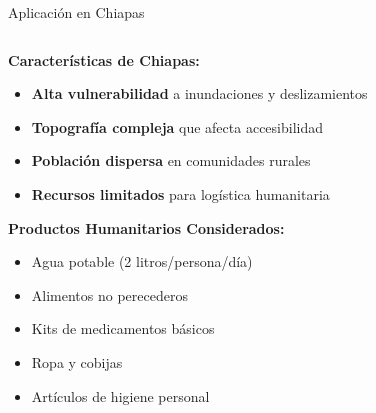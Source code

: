 \documentclass[
  ignorenonframetext,
]{beamer}
\providecommand{\tightlist}{%
  \setlength{\itemsep}{0pt}\setlength{\parskip}{0pt}}
\begin{document}
\begin{frame}{Aplicación en Chiapas}
\label{aplicaciuxf3n-en-chiapas}
\begin{columns}[T]
\begin{column}{0.6\linewidth}
\justifying

\textbf{Características de Chiapas:}

\begin{itemize}
\tightlist
\item
  \textbf{Alta vulnerabilidad} a inundaciones y deslizamientos
\item
  \textbf{Topografía compleja} que afecta accesibilidad
\item
  \textbf{Población dispersa} en comunidades rurales
\item
  \textbf{Recursos limitados} para logística humanitaria
\end{itemize}

\textbf{Productos Humanitarios Considerados:}

\begin{itemize}
\tightlist
\item
  Agua potable (2 litros/persona/día)
\item
  Alimentos no perecederos
\item
  Kits de medicamentos básicos
\item
  Ropa y cobijas
\item
  Artículos de higiene personal
\end{itemize}
\end{column}


\end{columns}
\end{frame}
\end{document}
